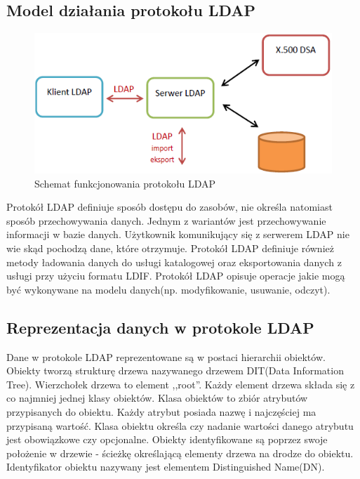	\subsection{Model działania protokołu LDAP}

		\begin{figure}[h]
			\centering
			\includegraphics{img/ldap.png}
			\caption{Schemat funkcjonowania protokołu  LDAP}
			\label{Schemat funkcjonowania protokolu  LDAP}
		\end{figure}

		Protokół LDAP definiuje sposób dostępu do zasobów, nie określa natomiast sposób przechowywania danych. Jednym z wariantów jest przechowywanie informacji w bazie danych. Użytkownik komunikujący się z serwerem LDAP nie wie skąd pochodzą dane, które otrzymuje. Protokół LDAP definiuje również metody ładowania danych do usługi katalogowej oraz eksportowania danych z usługi przy użyciu formatu LDIF. Protokół LDAP opisuje operacje jakie mogą być wykonywane na modelu danych(np. modyfikowanie, usuwanie, odczyt).

	\subsection{Reprezentacja danych w protokole LDAP}

		Dane w protokole LDAP reprezentowane są w postaci hierarchii obiektów\cite{ZyTrax13}. Obiekty tworzą strukturę drzewa nazywanego drzewem DIT(Data Information Tree). Wierzchołek drzewa to element ,,root''. Każdy element drzewa składa się z co najmniej jednej klasy obiektów. Klasa obiektów to zbiór atrybutów przypisanych do obiektu. Każdy atrybut posiada nazwę i najczęściej ma przypisaną wartość. Klasa obiektu określa czy nadanie wartości danego atrybutu jest obowiązkowe czy opcjonalne. Obiekty identyfikowane są poprzez swoje położenie w drzewie - ścieżkę określającą elementy drzewa na drodze do obiektu. Identyfikator obiektu nazywany jest elementem Distinguished Name(DN).

